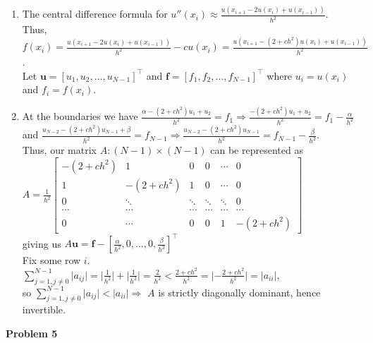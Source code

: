 \documentclass[10pt]{article}
\begin{document}
\begin{enumerate}[label=(\alph*)]
    \item The central difference formula for $u''(x_i)\approx\frac{u(x_{i+1}-2u(x_i)+u(x_{i-1}))}{h^2}$.\\
    Thus, $f(x_i)=\frac{u(x_{i+1}-2u(x_i)+u(x_{i-1}))}{h^2}-cu(x_i)=\frac{u(x_{i+1}-(2+ch^2)u(x_i)+u(x_{i-1}))}{h^2}$.\\
    Let $\mathbf{u}={[u_1,u_2,\ldots,u_{N-1}]}^\top$ and $\mathbf{f}={[f_1,f_2,\ldots,f_{N-1}]}^\top$ where $u_i=u(x_i)$ and $f_i=f(x_i)$.\\
    \item At the boundaries we have $\frac{\alpha-(2+ch^2)u_1+u_2}{h^2}=f_1\Rightarrow \frac{-(2+ch^2)u_1+u_2}{h^2}=f_1-\frac{\alpha}{h^2}$ and $\frac{u_{N-2}-(2+ch^2)u_{N-1}+\beta}{h^2}=f_{N-1}\Rightarrow \frac{u_{N-2}-(2+ch^2)u_{N-1}}{h^2}=f_{N-1}-\frac{\beta}{h^2}$.\\
    Thus, our matrix $A:(N-1)\times (N-1)$ can be represented as\\ 
    $A=\frac{1}{h^2}\begin{bmatrix}
        -(2+ch^2) & 1 & 0 & 0 & \cdots & 0\\
        1 & -(2+ch^2) & 1 & 0 & \cdots & 0\\
        0 & \ddots & \ddots & \ddots & \ddots & 0\\
        \cdots & \cdots & \cdots & \cdots & \cdots & \cdots\\
        0 & \cdots & 0 & 0 & 1 & -(2+ch^2)
    \end{bmatrix}$\\
    giving us $A\mathbf{u}=\mathbf{f}-{[\frac{\alpha}{h^2},0,\ldots,0,\frac{\beta}{h^2}]}^\top$\\
    Fix some row $i$.\\ 
    $\displaystyle\sum_{j=1,j\neq 0}^{N-1}\lvert a_{ij}\rvert=\lvert \frac{1}{h^2}\rvert+\lvert \frac{1}{h^2}\rvert=\frac{2}{h^2}<\frac{2+ch^2}{h^2}=\lvert -\frac{2+ch^2}{h^2}\rvert=\lvert a_{ii}\rvert$,\\
    so $\displaystyle\sum_{j=1,j\neq 0}^{N-1}\lvert a_{ij}\rvert<\lvert a_{ii}\rvert\Rightarrow$ $A$ is strictly diagonally dominant, hence invertible.
\end{enumerate}
\textbf{Problem 5}\\
\end{document}
